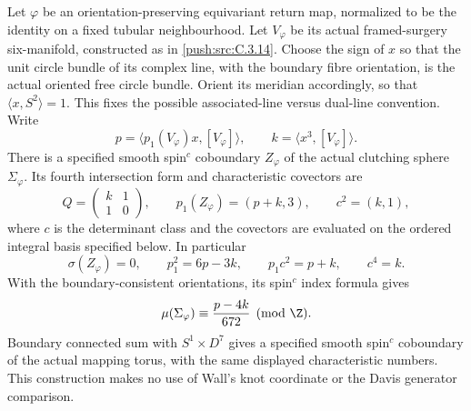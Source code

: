 \begin{proposition}\label{push:src:C.3.25}
Let $\varphi$ be an orientation-preserving equivariant return map,
normalized to be the identity on a fixed tubular neighbourhood.
Let $V_\varphi$ be its actual framed-surgery six-manifold, constructed
as in \ref{push:src:C.3.14}. Choose the sign of $x$ so that the unit circle
bundle of its complex line, with the boundary fibre orientation,
is the actual oriented free circle bundle. Orient its meridian
accordingly, so that $\langle x,S^2\rangle=1$. This fixes the
possible associated-line versus dual-line convention. Write
\[
 p=\langle p_1(V_\varphi)x,[V_\varphi]\rangle,
 \qquad k=\langle x^3,[V_\varphi]\rangle.
\]
There is a specified smooth spin$^c$ coboundary $Z_\varphi$ of
the actual clutching sphere $\Sigma_\varphi$. Its fourth
intersection form and characteristic covectors are
\[
 Q=\begin{pmatrix}k&1\\1&0\end{pmatrix},\qquad
 p_1(Z_\varphi)=(p+k,3),\qquad c^2=(k,1),
\]
where $c$ is the determinant class and the covectors are evaluated
on the ordered integral basis specified below. In particular
\[
 \sigma(Z_\varphi)=0,\qquad
 p_1^2=6p-3k,\qquad p_1c^2=p+k,\qquad c^4=k.
\]
With the boundary-consistent orientations, its spin$^c$ index
formula gives
\[
 \mu(\Sigma_\varphi)\equiv\frac{p-4k}{672}\pmod\Z.
\]
Boundary connected sum with $S^1\times D^7$ gives a specified
smooth spin$^c$ coboundary of the actual mapping torus, with the
same displayed characteristic numbers. This construction makes
no use of Wall's knot coordinate or the Davis generator comparison.
\end{proposition}
